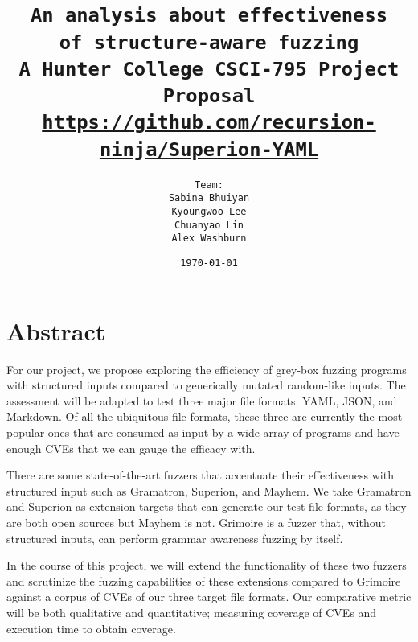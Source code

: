 \documentclass[12pt]{diazessay}
\title{\texttt{\huge{An analysis about effectiveness\\\vspace{-3mm}of structure-aware fuzzing} \\\vspace{-0.35cm} {\large A Hunter College CSCI-795 Project Proposal}\\\normalsize\url{https://github.com/recursion-ninja/Superion-YAML}}} %
\author{\texttt{{\Huge Team:}\\\vspace*{-0.5em} 
		Sabina Bhuiyan \\\vspace*{-0.5em} 
		Kyoungwoo Lee \\\vspace*{-0.5em}
		Chuanyao Lin \\\vspace*{-0.25em}
		Alex Washburn}} %
\date{\texttt{\today}} %
\begin{document}
\maketitle %

\vspace{2cm}
\section*{Abstract}


For our project, we propose exploring the efficiency of grey-box fuzzing programs with structured inputs compared to generically mutated random-like inputs.
The assessment will be adapted to test three major file formats: YAML, JSON, and Markdown.
Of all the ubiquitous file formats, these three are currently the most popular ones that are consumed as input by a wide array of programs and have enough CVEs that we can gauge the efficacy with.

There are some state-of-the-art fuzzers that accentuate their effectiveness with structured input such as Gramatron, Superion, and Mayhem.
We take Gramatron and Superion as extension targets that can generate our test file formats, as they are both open sources but Mayhem is not.
Grimoire is a fuzzer that, without structured inputs, can perform grammar awareness fuzzing by itself.

In the course of this project, we will extend the functionality of these two fuzzers and scrutinize the fuzzing capabilities of these extensions compared to Grimoire against a corpus of CVEs of our three target file formats.
Our comparative metric will be both qualitative and quantitative; measuring coverage of CVEs and execution time to obtain coverage.

\clearpage
\end{document}
